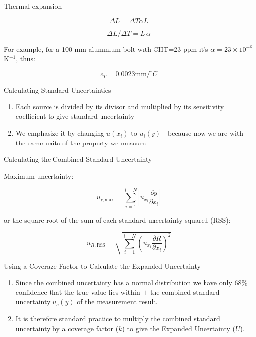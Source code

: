 \documentclass[12pt]{beamer}
\begin{document}
\begin{frame}{Thermal expansion}

\[ \Delta L = \Delta T \alpha L \]

\[\Delta L/\Delta T = L\, \alpha \]

For example, for a 100 mm aluminium bolt with CHT=23 ppm it's $\alpha = 23 \times 10^{-6}$ K$^{-1}$, thus:

\[c_T = 0.0023 \mathrm{mm}/^\circ C\]

\end{frame}


\begin{frame}{Calculating Standard Uncertainties}
\begin{enumerate}
\item Each source is divided by its divisor and multiplied by its sensitivity coefficient to give \alert{standard uncertainty}

\item  We emphasize it by changing $u(x_i)$ to $u_i(y)$ - because now we are with the same units of the property we measure

\end{enumerate}

\end{frame}


\begin{frame}{Calculating the Combined Standard Uncertainty}

Maximum uncertainty: 

\[
u_{y,\mathrm{max}}=\sum_{i=1}^{i=N}\left|u_{x_{i}}\frac{\partial y}{\partial x_{i}}\right|
\]

or the square root of the sum of each standard uncertainty squared (RSS):

\[
u_{R,\mathrm{RSS}}=\sqrt{\sum_{i=1}^{i=N}\left(u_{x_{i}}\frac{\partial R}{\partial x_{i}}\right)^{2}}
\]

\end{frame}


\begin{frame}{Using a Coverage Factor to Calculate the Expanded Uncertainty}

\begin{enumerate}
\item Since the combined uncertainty has a normal distribution we have only 68\% confidence that the true value lies within $\pm$ the combined standard uncertainty $u_c(y)$ of the measurement result. 

\item It is therefore standard practice to multiply the combined standard uncertainty by a coverage factor ($k$) to give the \alert{Expanded Uncertainty} ($U$). 
\end{enumerate}
\end{frame}
\end{document}
